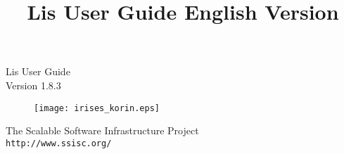 \documentclass[a4paper]{article}
\title{Lis User Guide English Version}
\author{}
\date{}
\begin{document}
\vspace*{4cm}
\begin{flushleft}
{\Large Lis User Guide}\\
Version 1.8.3
\end{flushleft}

\vspace*{2cm}
\begin{figure}[h]
\texttt{[image: irises\_korin.eps]}
\end{figure}

\vspace*{2cm}
\begin{flushleft}
{\large The Scalable Software Infrastructure
Project\\
{\tt http://www.ssisc.org/}}\\
\end{flushleft}

\vspace*{5mm}
\thispagestyle{empty}
\end{document}
